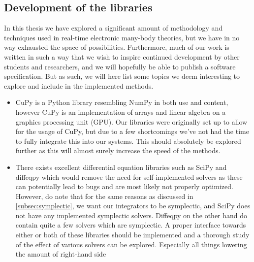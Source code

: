         \subsection{Development of the libraries}
            In this thesis we have explored a significant amount of methodology
            and techniques used in real-time electronic many-body theories, but
            we have in no way exhausted the space of possibilities.
            Furthermore, much of our work is written in such a way that we wish
            to inspire continued development by other students and researchers,
            and we will hopefully be able to publish a software specification.
            But as such, we will here list some topics we deem interesting to
            explore and include in the implemented methods.
            \begin{itemize}
                \item CuPy \cite{cupy} is a Python library resembling NumPy
                    \cite{numpy} in both use and content, however CuPy is an
                    implementation of arrays and linear algebra on a graphics
                    processing unit (GPU).
                    Our libraries were originally set up to allow for the usage
                    of CuPy, but due to a few shortcomings we've not had the
                    time to fully integrate this into our systems.
                    This should absolutely be explored
                    further as this will almost surely increase the speed of the
                    methods.
                \item There exists excellent differential equation libraries
                    such as SciPy \cite{scipy} and diffeqpy \cite{julia-diff}
                    which would remove the need for self-implemented solvers as
                    these can potentially lead to bugs and are most likely not
                    properly optimized.
                    However, do note that for the same reasons as discussed in
                    \autoref{subsec:symplectic}, we want our integrators to be
                    symplectic, and SciPy does not have any implemented
                    symplectic solvers.
                    Diffeqpy on the other hand do contain quite a few solvers
                    which are symplectic.
                    A proper interface towards either or both of these libraries
                    should be implemented and a thorough study of the effect of
                    various solvers can be explored.
                    Especially all things lowering the amount of right-hand side

\end{itemize}
